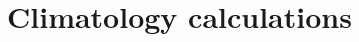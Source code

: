 \documentclass[a4paper,11pt]{article}
\begin{document}







\section{Climatology calculations}
\label{sec:climatology}
\end{document}
